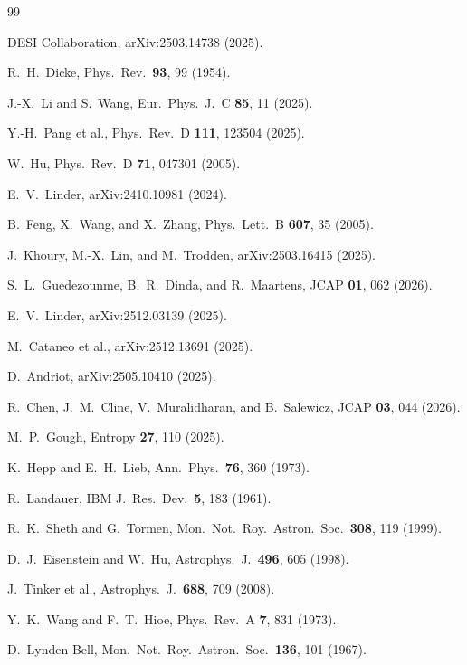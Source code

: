 \documentclass[aps,prd,twocolumn,superscriptaddress]{revtex4-2}
\begin{document}
\begin{thebibliography}{99}

DESI Collaboration, arXiv:2503.14738 (2025).

R.~H.~Dicke, Phys.\ Rev.\ \textbf{93}, 99 (1954).

J.-X.~Li and S.~Wang, Eur.\ Phys.\ J.\ C \textbf{85}, 11 (2025).

Y.-H.~Pang et al., Phys.\ Rev.\ D \textbf{111}, 123504 (2025).

W.~Hu, Phys.\ Rev.\ D \textbf{71}, 047301 (2005).

E.~V.~Linder, arXiv:2410.10981 (2024).

B.~Feng, X.~Wang, and X.~Zhang, Phys.\ Lett.\ B \textbf{607}, 35 (2005).

J.~Khoury, M.-X.~Lin, and M.~Trodden, arXiv:2503.16415 (2025).

S.~L.~Guedezounme, B.~R.~Dinda, and R.~Maartens, JCAP \textbf{01}, 062 (2026).

E.~V.~Linder, arXiv:2512.03139 (2025).

M.~Cataneo et al., arXiv:2512.13691 (2025).

D.~Andriot, arXiv:2505.10410 (2025).

R.~Chen, J.~M.~Cline, V.~Muralidharan, and B.~Salewicz, JCAP \textbf{03}, 044 (2026).

M.~P.~Gough, Entropy \textbf{27}, 110 (2025).

K.~Hepp and E.~H.~Lieb, Ann.\ Phys.\ \textbf{76}, 360 (1973).

R.~Landauer, IBM J.\ Res.\ Dev.\ \textbf{5}, 183 (1961).

R.~K.~Sheth and G.~Tormen, Mon.\ Not.\ Roy.\ Astron.\ Soc.\ \textbf{308}, 119 (1999).

D.~J.~Eisenstein and W.~Hu, Astrophys.\ J.\ \textbf{496}, 605 (1998).

J.~Tinker et al., Astrophys.\ J.\ \textbf{688}, 709 (2008).

Y.~K.~Wang and F.~T.~Hioe, Phys.\ Rev.\ A \textbf{7}, 831 (1973).

D.~Lynden-Bell, Mon.\ Not.\ Roy.\ Astron.\ Soc.\ \textbf{136}, 101 (1967).


\end{thebibliography}
\end{document}
